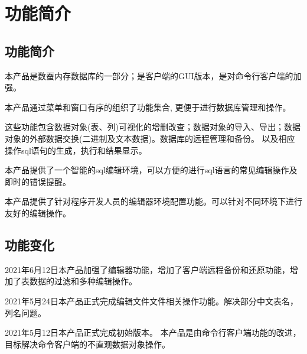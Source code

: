 \section{功能简介}\label{function}

\linespread{1.2}
\large
\subsection{功能简介}
本产品是数蚕内存数据库的一部分；是客户端的GUI版本，是对命令行客户端的加强。

本产品通过菜单和窗口有序的组织了功能集合, 更便于进行数据库管理和操作。

这些功能包含数据对象(表、列)可视化的增删改查；数据对象的导入、导出；数据对象的外部数据交换(二进制及文本数据)。数据库的远程管理和备份。
以及相应操作sql语句的生成，执行和结果显示。

本产品提供了一个智能的sql编辑环境，可以方便的进行sql语言的常见编辑操作及即时的错误提醒。

本产品提供了针对程序开发人员的编辑器环境配置功能。可以针对不同环境下进行友好的编辑操作。

\subsection{功能变化}
\bigskip
2021年6月12日本产品加强了编辑器功能，增加了客户端远程备份和还原功能，增加了表数据的过滤和多种编辑操作。

2021年5月24日本产品正式完成编辑文件文件相关操作功能。解决部分中文表名，列名问题。

2021年5月12日本产品正式完成初始版本。
本产品是由命令行客户端功能的改进，目标解决命令客户端的不直观数据对象操作。
